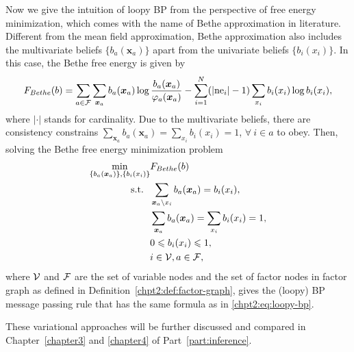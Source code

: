 Now we give the intuition of loopy BP from the perspective of free energy minimization, which comes with the name of Bethe approximation in literature.
Different from the mean field approximation, Bethe approximation also includes the multivariate beliefs $\{b_{a}(\bm{x}_{a})\}$ apart from the univariate beliefs $\{b_i(x_i)\}$\cite{yedidia2003understanding}. In this case, the Bethe free energy is given by
\begin{align}\label{chpt2:bethe-free-energy}
  F_{Bethe}(b) = \sum_{a\in \mathcal{F}} \sum_{\bm{x}_{a}}
  b_{a}(\bm{x}_{a})\log{\frac{b_{a}(\bm{x}_{a})}{\varphi_{a}(\bm{x}_{a})}
  } -  \sum_{i=1}^{N} (|\mathrm{ne}_i| - 1) \sum_{x_i} b_i(x_i) \log{b_i(x_i)},
\end{align}
where $|\cdot|$ stands for cardinality.
Due to the multivariate beliefs, there are consistency constrains $\sum_{\bm{x}_{a}} b_{a}(\bm{x}_{a}) = \sum_{ x_i} b_i({x}_i) =1$, $\forall~ i \in a$ to obey. Then, solving the Bethe free energy minimization problem
\begin{align}
  \min_{\{b_{a}(\bm{x}_{a})\}, \{b_i(x_i)\}}& F_{Bethe}(b) \nonumber \\
  \mathrm{s.t.}~~ & \sum_{\bm{x}_{a} \backslash x_i} b_{a}(\bm{x}_{a})  =
                    b_i(x_i), \nonumber \\
                                                      & \sum_{\bm{x}_{a}} b_{a}(\bm{x}_{a}) = \sum_{ x_i} b_i({x}_i) =1,
                                                        \nonumber \\
                                                      &  0 \leqslant b_i(x_i) \leqslant 1,  \nonumber \\
                                                      & i \in \mathcal{V} , a \in \mathcal{F},
\end{align}
where $\mathcal{V}$ and $\mathcal{F}$ are the set of variable nodes and the set of
factor nodes in factor graph as defined in
Definition~\ref{chpt2:def:factor-graph}, gives the (loopy) BP message passing rule that has the same formula as in \eqref{chpt2:eq:loopy-bp}.

These variational approaches will be further discussed and compared in Chapter~\ref{chapter3} and \ref{chapter4} of Part~\ref{part:inference}.

